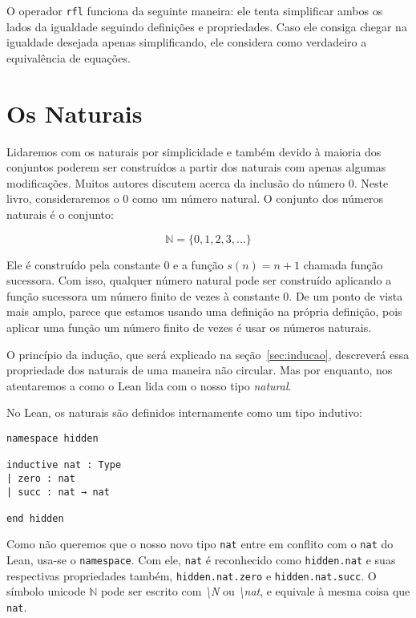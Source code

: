 O operador \lstinline{rfl} funciona da seguinte maneira: ele tenta simplificar ambos os lados da igualdade seguindo definições e propriedades. Caso ele consiga chegar na igualdade desejada apenas simplificando, ele considera como verdadeiro a equivalência de equações.

\section{Os Naturais}
\label{sec:naturais}

Lidaremos com os naturais por simplicidade e também devido à maioria dos conjuntos poderem ser construídos a partir dos naturais com apenas algumas modificações. Muitos autores discutem acerca da inclusão do número $0$. Neste livro, consideraremos o $0$ como um número natural. O conjunto dos números naturais é o conjunto:

\[ \mathbb{N} = \{0,1,2,3,...\}\]

Ele é construído pela constante $0$ e a função $s(n)=n+1$ chamada função sucessora. Com isso, qualquer número natural pode ser construído aplicando a função sucessora um número finito de vezes à constante $0$. De um ponto de vista mais amplo, parece que estamos usando uma definição na própria definição, pois aplicar uma função um número finito de vezes é usar os números naturais. 

O princípio da indução, que será explicado na seção~\ref{sec:inducao}, descreverá essa propriedade dos naturais de uma maneira não circular. Mas por enquanto, nos atentaremos a como o Lean lida com o nosso tipo \textit{natural}.

No Lean, os naturais são definidos internamente como um tipo indutivo:

\begin{lstlisting}
namespace hidden

inductive nat : Type
| zero : nat
| succ : nat → nat

end hidden
\end{lstlisting}

Como não queremos que o nosso novo tipo \lstinline{nat} entre em conflito com o \lstinline{nat} do Lean, usa-se o \lstinline{namespace}. Com ele, \lstinline{nat} é reconhecido como \lstinline{hidden.nat} e suas respectivas propriedades também, \lstinline{hidden.nat.zero} e \lstinline{hidden.nat.succ}. O símbolo unicode $\mathbb{N}$ pode ser escrito com \textit{\textbackslash N} ou \textit{\textbackslash nat}, e equivale à mesma coisa que \lstinline{nat}.

